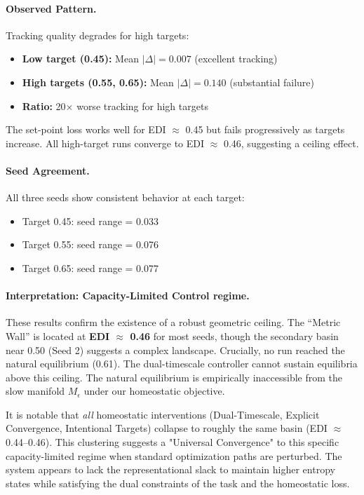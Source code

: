\paragraph{Observed Pattern.}
Tracking quality degrades for high targets:
\begin{itemize}
\item \textbf{Low target (0.45):} Mean $|\Delta| = 0.007$ (excellent tracking)
\item \textbf{High targets (0.55, 0.65):} Mean $|\Delta| = 0.140$ (substantial failure)
\item \textbf{Ratio:} 20× worse tracking for high targets
\end{itemize}

The set-point loss works well for EDI $\approx$ 0.45 but fails progressively as targets increase. All high-target runs converge to EDI $\approx$ 0.46, suggesting a ceiling effect.

\paragraph{Seed Agreement.}
All three seeds show consistent behavior at each target:
\begin{itemize}
\item Target 0.45: seed range = 0.033
\item Target 0.55: seed range = 0.076
\item Target 0.65: seed range = 0.077
\end{itemize}

\paragraph{Interpretation: Capacity-Limited Control regime.}
These results confirm the existence of a robust geometric ceiling. The ``Metric Wall'' is located at \textbf{EDI $\approx$ 0.46} for most seeds, though the secondary basin near 0.50 (Seed 2) suggests a complex landscape. Crucially, no run reached the natural equilibrium (0.61). The dual-timescale controller cannot sustain equilibria above this ceiling. The natural equilibrium is empirically inaccessible from the slow manifold $M_\epsilon$ under our homeostatic objective.

It is notable that \emph{all} homeostatic interventions (Dual-Timescale, Explicit Convergence, Intentional Targets) collapse to roughly the same basin (EDI $\approx$ 0.44--0.46). This clustering suggests a "Universal Convergence" to this specific capacity-limited regime when standard optimization paths are perturbed. The system appears to lack the representational slack to maintain higher entropy states while satisfying the dual constraints of the task and the homeostatic loss.

